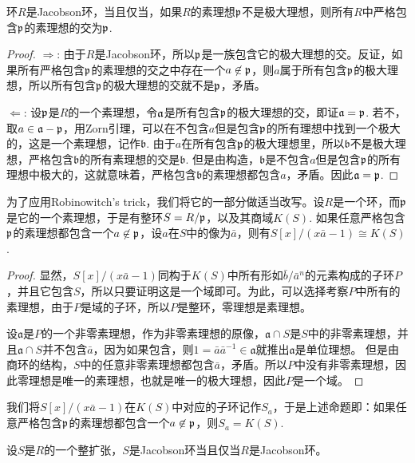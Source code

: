 \begin{pro}
环$R$是Jacobson环，当且仅当，如果$R$的素理想$\mathfrak{p}$不是极大理想，则所有$R$中严格包含$\mathfrak{p}$的素理想的交为$\mathfrak{p}$.
\end{pro}

\begin{proof} $\Rightarrow$: 由于$R$是Jacobson环，所以$\mathfrak{p}$是一族包含它的极大理想的交。反证，如果所有严格包含$\mathfrak{p}$的素理想的交之中存在一个$a\not\in \mathfrak{p}$，则$a$属于所有包含$\mathfrak{p}$的极大理想，所以所有包含$\mathfrak{p}$的极大理想的交就不是$\mathfrak{p}$，矛盾。

$\Leftarrow$: 设$\mathfrak{p}$是$R$的一个素理想，令$\mathfrak{a}$是所有包含$\mathfrak{p}$的极大理想的交，即证$\mathfrak{a}=\mathfrak{p}$. 若不，取$a\in \mathfrak{a}-\mathfrak{p}$，用Zorn引理，可以在不包含$a$但是包含$\mathfrak{p}$的所有理想中找到一个极大的，这是一个素理想，记作$\mathfrak{b}$. 由于$a$在所有包含$\mathfrak{p}$的极大理想里，所以$\mathfrak{b}$不是极大理想，严格包含$\mathfrak{b}$的所有素理想的交是$\mathfrak{b}$. 但是由构造，$\mathfrak{b}$是不包含$a$但是包含$\mathfrak{p}$的所有理想中极大的，这就意味着，严格包含$\mathfrak{b}$的素理想都包含$a$，矛盾。因此$\mathfrak{a}=\mathfrak{p}$.\end{proof}

为了应用Robinowitch's trick，我们将它的一部分做适当改写。设$R$是一个环，而$\mathfrak{p}$是它的一个素理想，于是有整环$S=R/\mathfrak{p}$，以及其商域$K(S)$. 如果任意严格包含$\mathfrak{p}$的素理想都包含一个$a\not\in \mathfrak{p}$，设$a$在$S$中的像为$\bar{a}$，则有$S[x]/(x\bar{a}-1)\cong K(S)$.

\begin{proof} 显然，$S[x]/(x\bar{a}-1)$同构于$K(S)$中所有形如$\bar{b}/\bar{a}^n$的元素构成的子环$P$，并且它包含$S$，所以只要证明这是一个域即可。为此，可以选择考察$P$中所有的素理想，由于$P$是域的子环，所以$P$是整环，零理想是素理想。

设$\mathfrak{a}$是$P$的一个非零素理想，作为非零素理想的原像，$\mathfrak{a}\cap S$是$S$中的非零素理想，并且$\mathfrak{a}\cap S$并不包含$\bar{a}$，因为如果包含，则$1=\bar{a}\bar{a}^{-1}\in \mathfrak{a}$就推出$\mathfrak{a}$是单位理想。 但是由商环的结构，$S$中的任意非零素理想都包含$\bar{a}$，矛盾。所以$P$中没有非零素理想，因此零理想是唯一的素理想，也就是唯一的极大理想，因此$P$是一个域。\end{proof}

我们将$S[x]/(x\bar{a}-1)$在$K(S)$中对应的子环记作$S_a$，于是上述命题即：如果任意严格包含$\mathfrak{p}$的素理想都包含一个$a\not\in \mathfrak{p}$，则$S_a=K(S)$. 

\begin{pro}
设$S$是$R$的一个整扩张，$S$是Jacobson环当且仅当$R$是Jacobson环。
\end{pro}

